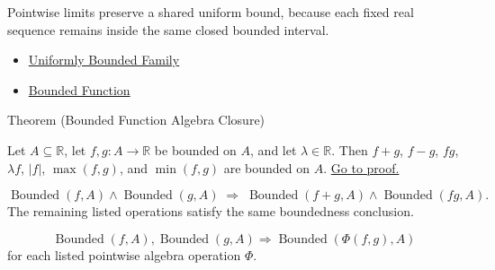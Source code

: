 \begin{remark*}[Interpretation]
Pointwise limits preserve a shared uniform bound, because each fixed real
sequence remains inside the same closed bounded interval.
\end{remark*}

\begin{dependencies}
\begin{itemize}
  \item \hyperref[def:uniformly-bounded-family]{Uniformly Bounded Family}
  \item \hyperref[def:function-bounded]{Bounded Function}
\end{itemize}
\end{dependencies}


\begin{theorembox}{Theorem (Bounded Function Algebra Closure)}
\begin{theorem}
\label{thm:bounded-function-algebra-closure}
Let \(A\subseteq\mathbb{R}\), let \(f,g:A\to\mathbb{R}\) be bounded on
\(A\), and let \(\lambda\in\mathbb{R}\).  Then \(f+g\), \(f-g\), \(fg\),
\(\lambda f\), \(|f|\), \(\max(f,g)\), and \(\min(f,g)\) are bounded on
\(A\).
\hyperref[prf:bounded-function-algebra-closure]{Go to proof.}
\end{theorem}
\end{theorembox}

\begin{remark*}
\[
  \operatorname{Bounded}(f,A)\wedge\operatorname{Bounded}(g,A)
  \;\Longrightarrow\;
  \operatorname{Bounded}(f+g,A)\wedge\operatorname{Bounded}(fg,A).
\]
The remaining listed operations satisfy the same boundedness conclusion.
\end{remark*}

\begin{remark*}
\[
  \operatorname{Bounded}(f,A),\operatorname{Bounded}(g,A)
  \Rightarrow
  \operatorname{Bounded}(\Phi(f,g),A)
\]
for each listed pointwise algebra operation \(\Phi\).
\end{remark*}

